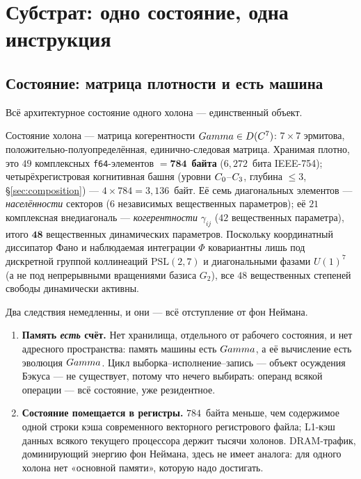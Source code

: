 \section{Субстрат: одно состояние, одна инструкция}
\label{sec:substrate}

\subsection{Состояние: матрица плотности и есть машина}

Всё архитектурное состояние одного холона \TALOS{} --- единственный объект.

\begin{defbox}
Состояние холона --- матрица когерентности $Gamma\in D(C^7)$:
$7\times7$ эрмитова, положительно-полуопределённая, единично-следовая матрица.
Хранимая плотно, это $49$ комплексных \texttt{f64}-элементов $=\mathbf{784}$~\textbf{байта}
($6{,}272$~бита IEEE-754); четырёхрегистровая когнитивная башня (уровни
$C_0$--$C_3$, глубина $\le 3$, \S\ref{sec:composition}) ---
$4\times784=3{,}136$~байт. Её семь диагональных элементов --- \emph{населённости}
секторов ($6$ независимых вещественных параметров); её $21$ комплексная
внедиагональ --- \emph{когерентности} $\gamma_{ij}$ ($42$ вещественных параметра),
итого $\mathbf{48}$ вещественных динамических параметров. Поскольку координатный
диссипатор Фано и наблюдаемая интеграции $\Phi$ ковариантны лишь под дискретной
группой коллинеаций $\mathrm{PSL}(2,7)$ и диагональными фазами $U(1)^7$ (а не
под непрерывными вращениями базиса $G_2$), все $48$ вещественных степеней свободы
динамически активны.
\end{defbox}

Два следствия немедленны, и они --- всё отступление от фон Неймана.

\begin{enumerate}[leftmargin=1.6em,itemsep=1pt]
  \item \textbf{Память \emph{есть} счёт.} Нет хранилища, отдельного от рабочего
        состояния, и нет адресного пространства: память машины есть $Gamma$, а её
        вычисление есть эволюция $Gamma$. Цикл выборка--исполнение--запись ---
        объект осуждения Бэкуса --- не существует, потому что нечего выбирать:
        операнд всякой операции --- всё состояние, уже резидентное.
  \item \textbf{Состояние помещается в регистры.} $784$~байта меньше, чем
        содержимое одной строки кэша современного векторного регистрового файла;
        L1-кэш данных всякого текущего процессора держит тысячи холонов.
        DRAM-трафик, доминирующий энергию фон Неймана, здесь не имеет аналога:
        для одного холона нет «основной памяти», которую надо достигать.
\end{enumerate}

